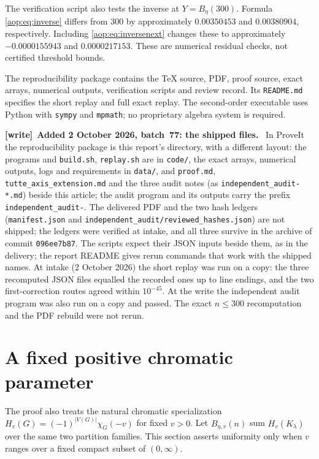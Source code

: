 \documentclass[11pt]{article}
\theoremstyle{remark}\newtheorem{remark}[theorem]{Remark}
\newenvironment{writenote}[1][]{\par\smallskip\begingroup\small
 \noindent\textbf{[write]}\if\relax\detokenize{#1}\relax\else~\textbf{#1.}\fi\ }%
 {\par\endgroup\smallskip}
\begin{document}
The verification script also tests the inverse at $Y=B_\eta(300)$.
Formula \eqref{aop:eq:inverse} differs from 300 by approximately
$0.00350453$ and $0.00380904$, respectively. Including
\eqref{aop:eq:inversenext} changes these to approximately
$-0.0000155943$ and $0.0000217153$.
These are numerical residual checks, not certified threshold bounds.

The reproducibility package contains the TeX source, PDF, proof source,
exact arrays, numerical outputs, verification scripts and review record.
Its \texttt{README.md} specifies the short replay and full exact replay.
The second-order executable uses Python with \texttt{sympy} and
\texttt{mpmath}; no proprietary algebra system is required.

\begin{writenote}[Added 2 October 2026, batch~77: the shipped files]
In ProveIt the reproducibility package is this report's directory, with a
different layout: the programs and \texttt{build.sh}, \texttt{replay.sh} are
in \texttt{code/}, the exact arrays, numerical outputs, logs and requirements
in \texttt{data/}, and \texttt{proof.md}, \texttt{tutte\_axis\_extension.md}
and the three audit notes (as \texttt{independent\_audit-*.md}) beside this
article; the audit program and its outputs carry the prefix
\texttt{independent\_audit-}. The delivered PDF and the two hash ledgers
(\texttt{manifest.json} and \texttt{independent\_audit/reviewed\_hashes.json})
are not shipped; the ledgers were verified at intake, and all three survive
in the archive of commit \texttt{096ee7b87}. The scripts expect their JSON
inputs beside them, as in the delivery; the report README gives rerun
commands that work with the shipped names. At intake (2 October 2026) the
short replay was run on a copy: the three recomputed JSON files equalled the
recorded ones up to line endings, and the two first-correction routes agreed
within $10^{-45}$. At the write the independent audit program was also run
on a copy and passed. The exact $n\le300$ recomputation and the PDF rebuild
were not rerun.
\end{writenote}

\section{A fixed positive chromatic parameter}\label{aop:sec:chromatic}

The proof also treats the natural chromatic specialization
$H_v(G)=(-1)^{|V(G)|}\chi_G(-v)$ for fixed $v>0$.
Let $B_{\eta,v}(n)$ sum $H_v(K_\lambda)$ over the same two partition
families. This section asserts uniformity only when $v$ ranges over a
fixed compact subset of $(0,\infty)$.
\end{document}
